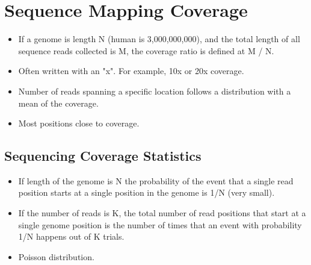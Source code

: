 \documentclass[10pt]{article}
\begin{document}
\section*{Sequence Mapping Coverage}
\begin{itemize}
    \item If a genome is length N (human is 3,000,000,000), and the total length of all sequence reads collected is M, the coverage ratio is defined at M / N.
    \item Often written with an "x".  For example, 10x or 20x coverage.
    \item Number of reads spanning a specific location follows a distribution with a mean of the coverage.
    \item Most positions close to coverage.
\end{itemize}
\subsection*{Sequencing Coverage Statistics}
\begin{itemize}
    \item If length of the genome is N the probability of the event that a single read position starts at a single position in the genome is 1/N (very small).
    \item If the number of reads is K, the total number of read positions that start at a single genome position is the number of times that an event with probability 1/N happens out of K trials.
    \item Poisson distribution.
\end{itemize}
\end{document}
